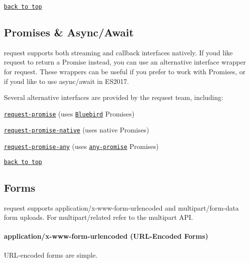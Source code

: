 \href{#table-of-contents}{\tt back to top}





\subsection*{Promises \& Async/\+Await}

{\ttfamily request} supports both streaming and callback interfaces natively. If you\textquotesingle{}d like {\ttfamily request} to return a Promise instead, you can use an alternative interface wrapper for {\ttfamily request}. These wrappers can be useful if you prefer to work with Promises, or if you\textquotesingle{}d like to use {\ttfamily async}/{\ttfamily await} in E\+S2017.

Several alternative interfaces are provided by the request team, including\+:
\begin{DoxyItemize}
\item \href{https://github.com/request/request-promise}{\tt {\ttfamily request-\/promise}} (uses \href{https://github.com/petkaantonov/bluebird}{\tt Bluebird} Promises)
\item \href{https://github.com/request/request-promise-native}{\tt {\ttfamily request-\/promise-\/native}} (uses native Promises)
\item \href{https://github.com/request/request-promise-any}{\tt {\ttfamily request-\/promise-\/any}} (uses \href{https://www.npmjs.com/package/any-promise}{\tt any-\/promise} Promises)
\end{DoxyItemize}

\href{#table-of-contents}{\tt back to top}





\subsection*{Forms}

{\ttfamily request} supports {\ttfamily application/x-\/www-\/form-\/urlencoded} and {\ttfamily multipart/form-\/data} form uploads. For {\ttfamily multipart/related} refer to the {\ttfamily multipart} A\+PI.

\paragraph*{application/x-\/www-\/form-\/urlencoded (U\+R\+L-\/\+Encoded Forms)}

U\+R\+L-\/encoded forms are simple.



